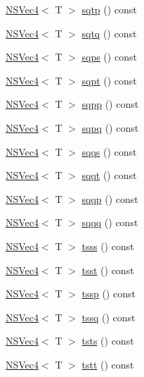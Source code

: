 \begin{DoxyCompactItemize}
\item 
\hyperlink{structNSVec4}{N\-S\-Vec4}$<$ T $>$ \hyperlink{structNSVec4_abe4b6799be9391b8429da12c490bc6cf}{sqtp} () const 
\item 
\hyperlink{structNSVec4}{N\-S\-Vec4}$<$ T $>$ \hyperlink{structNSVec4_ac7fd91b63146cb61bef20e9d97f82573}{sqtq} () const 
\item 
\hyperlink{structNSVec4}{N\-S\-Vec4}$<$ T $>$ \hyperlink{structNSVec4_a617f57c5d5ae0fb14e61bb1ea84774f1}{sqps} () const 
\item 
\hyperlink{structNSVec4}{N\-S\-Vec4}$<$ T $>$ \hyperlink{structNSVec4_ac916723a68241e063742bb05d46c9f46}{sqpt} () const 
\item 
\hyperlink{structNSVec4}{N\-S\-Vec4}$<$ T $>$ \hyperlink{structNSVec4_ad88fa8dbc76e18d658333f03a0cf8b32}{sqpp} () const 
\item 
\hyperlink{structNSVec4}{N\-S\-Vec4}$<$ T $>$ \hyperlink{structNSVec4_ac1759b66e28adeb468fa9e3888e2536a}{sqpq} () const 
\item 
\hyperlink{structNSVec4}{N\-S\-Vec4}$<$ T $>$ \hyperlink{structNSVec4_a03ee2ee0ed4333b936d5ec57e655173f}{sqqs} () const 
\item 
\hyperlink{structNSVec4}{N\-S\-Vec4}$<$ T $>$ \hyperlink{structNSVec4_ae028b12853fcdcf80b438e57b4d4592a}{sqqt} () const 
\item 
\hyperlink{structNSVec4}{N\-S\-Vec4}$<$ T $>$ \hyperlink{structNSVec4_a1a6cef20c844a9e66f5a8bb2707e19aa}{sqqp} () const 
\item 
\hyperlink{structNSVec4}{N\-S\-Vec4}$<$ T $>$ \hyperlink{structNSVec4_a28ba677c0cf87bf1c7785d972053ee23}{sqqq} () const 
\item 
\hyperlink{structNSVec4}{N\-S\-Vec4}$<$ T $>$ \hyperlink{structNSVec4_ad02cc5546541f8118e5b6a69c6314e13}{tsss} () const 
\item 
\hyperlink{structNSVec4}{N\-S\-Vec4}$<$ T $>$ \hyperlink{structNSVec4_ad092239cecf0b8d6a21d544474a60011}{tsst} () const 
\item 
\hyperlink{structNSVec4}{N\-S\-Vec4}$<$ T $>$ \hyperlink{structNSVec4_af939a8c24a37acb642d981a8261081b6}{tssp} () const 
\item 
\hyperlink{structNSVec4}{N\-S\-Vec4}$<$ T $>$ \hyperlink{structNSVec4_a5ef8c24dcc96b99a7094a2c06dc4bde3}{tssq} () const 
\item 
\hyperlink{structNSVec4}{N\-S\-Vec4}$<$ T $>$ \hyperlink{structNSVec4_a179981d73edd833df1d19c8bcb989780}{tsts} () const 
\item 
\hyperlink{structNSVec4}{N\-S\-Vec4}$<$ T $>$ \hyperlink{structNSVec4_affd61029ff2119b41379101578f7ff05}{tstt} () const 

\end{DoxyCompactItemize}
